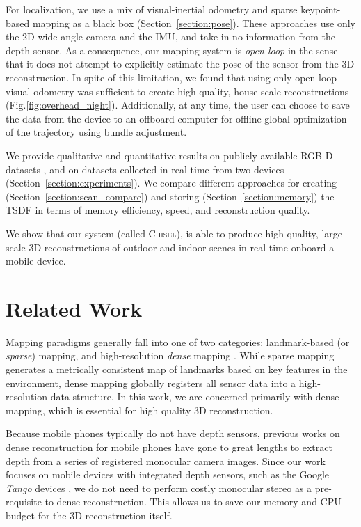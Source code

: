 \documentclass[conference]{IEEEtran}
\newcommand{\sref}[1]{Section~\ref{#1}}
\newcommand{\figref}[1]{Fig.\ref{#1}}
\newcommand{\Tango}{\textit{Tango} }
\newcommand{\chisel}{\textsc{Chisel}\xspace}
\begin{document}
For localization, we use a mix of  visual-inertial odometry \cite{VINS, VINS2}
and sparse keypoint-based mapping \cite{FastSlam} as a black box
(\sref{section:pose}). These approaches use only the 2D wide-angle camera and
the IMU, and take in no information from the depth sensor. As a consequence,
our mapping system  is \textit{open-loop} in the sense that it does not attempt
to explicitly estimate the pose of the sensor from the 3D reconstruction. In spite
of this limitation, we found that using only open-loop visual odometry was
sufficient to create high quality, house-scale reconstructions
(\figref{fig:overhead_night}). Additionally, at any time, the user can choose to
save the data from the device to an offboard computer for offline global
optimization of the trajectory using bundle adjustment.

 We provide qualitative and  quantitative results on publicly available RGB-D
 datasets \cite{FREIBURG}, and on datasets collected in real-time from two
 devices (\sref{section:experiments}). We compare different approaches for
 creating (\sref{section:scan_compare}) and storing (\sref{section:memory}) the
 TSDF in terms of memory efficiency, speed, and reconstruction quality.
 
 We show that our system (called \chisel), is able to produce high quality,
 large scale 3D reconstructions of outdoor and indoor scenes in real-time
 onboard a mobile device.

\section{Related Work}
Mapping paradigms generally fall into one of two categories: landmark-based (or
\emph{sparse}) mapping, and high-resolution \emph{dense} mapping
\cite{FastSlam}.  While sparse mapping generates a metrically consistent map of
landmarks based on key features in the environment, dense mapping globally
registers all sensor data into a high-resolution data structure. In this work,
we are concerned primarily with dense mapping, which is essential for high
quality 3D reconstruction.

Because mobile phones typically do not have depth sensors, previous works
\cite{TanskanenMetric, DTAM, LSDSlam} on dense reconstruction for mobile phones
have gone to great lengths to extract depth from a series of registered monocular camera
images. Since our work focuses on mobile devices with integrated depth sensors,
such as the Google \Tango devices \cite{Tango}, we do not need to perform
costly monocular stereo as a pre-requisite to dense reconstruction. This allows
us to save our memory and CPU budget for the 3D reconstruction itself.
\end{document}
